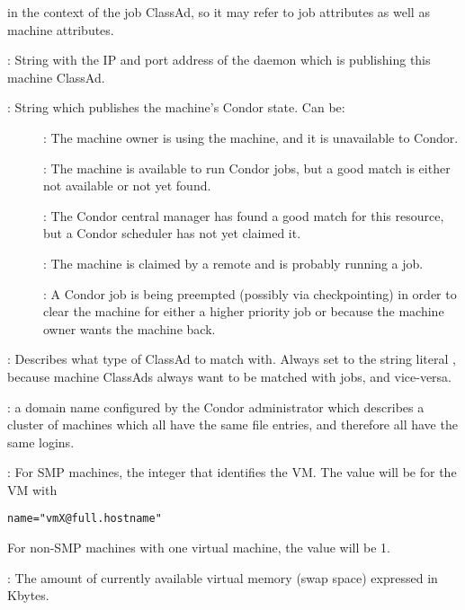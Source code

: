 \begin{description}
in the context of the job ClassAd, so it may refer to job attributes
as well as machine attributes.
%
\item[\AdAttr{StartdIpAddr}] : String with the IP and port address of the
 daemon which is publishing this machine ClassAd.
%
\item[\AdAttr{State}] : String which publishes the machine's Condor state.
Can be:
	\begin{description}
	\item[] : The machine owner is using the machine, and
it is unavailable to Condor.
	\item[] : The machine is available to run Condor jobs,
but a good match is either not available or not 
yet found.
	\item[] : The Condor central manager has found a good
match for this resource, but a Condor scheduler has not yet claimed it.
	\item[] : The machine is claimed by a remote
 and is probably running a job.
	\item[] : A Condor job is being preempted (possibly
via checkpointing) in order to clear the machine for either a higher
priority job or because the machine owner wants the machine back.
	\end{description}   %
%
\item[\AdAttr{TargetType}] : Describes what type of ClassAd to match with.
Always set to the string literal , because machine ClassAds
always want to be matched with jobs, and vice-versa.
%
\item[\AdAttr{UidDomain}] : a domain name configured by the Condor 
administrator which describes a cluster of machines which all have 
the same  file entries, and therefore all have the same logins.
%
\item[\AdAttr{VirtualMachineID}] : For SMP machines, the integer
that identifies the VM.
The value will be \verb@X@ for the VM with 
\begin{verbatim}
name="vmX@full.hostname"
\end{verbatim}
For non-SMP machines with one virtual machine, the value will be 1.
%
\item[\AdAttr{VirtualMemory}] : The amount of currently available virtual memory 
(swap space) expressed in Kbytes.

\end{description}

